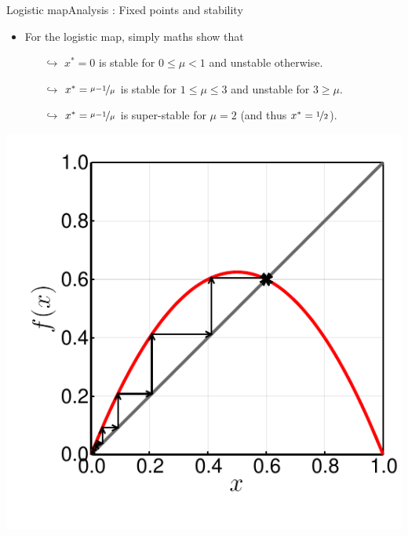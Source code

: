 \documentclass[usenames,dvipsnames,svgnames,10pt,aspectratio=169]{beamer}
\begin{document}
\begin{frame}[t, c]{Logistic map}{Analysis : Fixed points and stability}
\begin{minipage}{.68\textwidth}
\begin{itemize}
			\item For the logistic map, simply maths show that
			\begin{itemize}
				\item[\( \hookrightarrow \)] \( x^* = 0 \) is stable for \( 0 \leq \mu < 1 \) and unstable otherwise.
				\item[\( \hookrightarrow \)] \( x^* = \nicefrac{\mu - 1}{\mu} \) is stable for \( 1 \leq \mu \leq 3\) and unstable for \( 3 \geq \mu \).
				\item[\( \hookrightarrow \)] \( x^* = \nicefrac{\mu - 1}{\mu} \) is super-stable for \( \mu = 2 \) (and thus \( x^* = \nicefrac{1}{2} \)).
			\end{itemize}
		\end{itemize}
	\end{minipage}%
	\hfill
	\begin{minipage}{.28\textwidth}
		\centering
		\includegraphics[width=\textwidth]{cobweb_logistic_map}
	\end{minipage}

	\vspace{1cm}
\end{frame}
\end{document}
